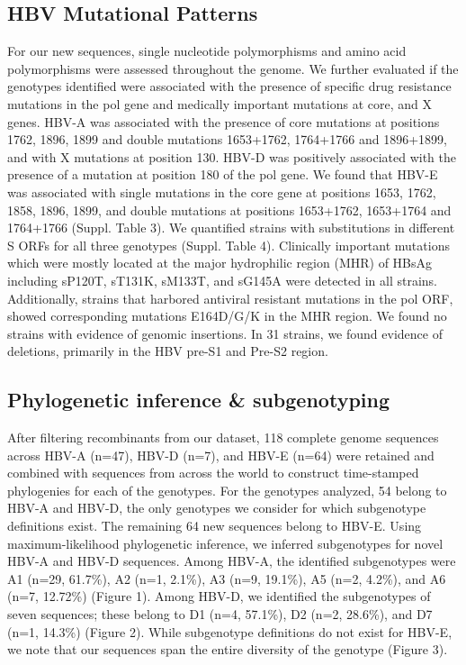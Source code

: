 \subsection{HBV Mutational Patterns}
For our new sequences, single nucleotide polymorphisms and amino acid polymorphisms were assessed throughout the genome. We further evaluated if the genotypes identified were associated with the presence of specific drug resistance mutations in the pol gene and medically important mutations at core, and X genes. HBV-A was associated with the presence of core mutations at positions 1762, 1896, 1899 and double mutations 1653+1762, 1764+1766 and 1896+1899, and with X mutations at position 130. HBV-D was positively associated with the presence of a mutation at position 180 of the pol gene. We found that HBV-E was associated with single mutations in the core gene at positions 1653, 1762, 1858, 1896, 1899, and double mutations at positions 1653+1762, 1653+1764 and 1764+1766 (Suppl. Table 3).
We quantified strains with substitutions in different S ORFs for all three genotypes (Suppl. Table 4). Clinically important mutations which were mostly located at the major hydrophilic region (MHR) of HBsAg including sP120T, sT131K, sM133T, and sG145A were detected in all strains. Additionally, strains that harbored antiviral resistant mutations in the pol ORF, showed corresponding mutations E164D/G/K in the MHR region. We found no strains with evidence of genomic insertions. In 31 strains, we found evidence of deletions, primarily in the HBV pre-S1 and Pre-S2 region.

\subsection{Phylogenetic inference \& subgenotyping}
After filtering recombinants from our dataset, 118 complete genome sequences across HBV-A (n=47), HBV-D (n=7), and HBV-E (n=64) were retained and combined with sequences from across the world to construct time-stamped phylogenies for each of the genotypes. For the genotypes analyzed, 54 belong to HBV-A and HBV-D, the only genotypes we consider for which subgenotype definitions exist. The remaining 64 new sequences belong to HBV-E. 
Using maximum-likelihood phylogenetic inference, we inferred subgenotypes for novel HBV-A and HBV-D sequences. Among HBV-A, the identified subgenotypes were A1 (n=29, 61.7\%), A2 (n=1, 2.1\%), A3 (n=9, 19.1\%), A5 (n=2,  4.2\%), and A6 (n=7, 12.72\%) (Figure 1). Among HBV-D, we identified the subgenotypes of seven sequences; these belong to D1 (n=4, 57.1\%), D2 (n=2, 28.6\%), and D7 (n=1, 14.3\%) (Figure 2). While subgenotype definitions do not exist for HBV-E, we note that our sequences span the entire diversity of the genotype (Figure 3). 


